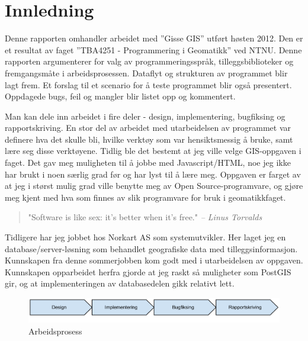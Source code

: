 \documentclass[a4paper]{article}
\begin{document}
\tableofcontents
\newpage

\section{Innledning}
	
	Denne rapporten omhandler arbeidet med ''Gisse GIS'' utført høsten 2012. Den er et resultat av faget ''TBA4251 - Programmering i Geomatikk'' ved NTNU. Denne rapporten argumenterer for valg av programmeringsspråk, tilleggsbiblioteker og fremgangsmåte i arbeidsprosessen. Dataflyt og strukturen av programmet blir lagt frem. Et forslag til et scenario for å teste programmet blir også presentert. Oppdagede bugs, feil og mangler blir listet opp og kommentert. 
	
	Man kan dele inn arbeidet i fire deler - design, implementering, bugfiksing og rapportskriving. En stor del av arbeidet med utarbeidelsen av programmet var definere hva det skulle bli, hvilke verktøy som var hensiktsmessig å bruke, samt lære seg disse verktøyene. Tidlig ble det bestemt at jeg ville velge GIS-oppgaven i faget. Det gav meg muligheten til å jobbe med Javascript/HTML, noe jeg ikke har brukt i noen særlig grad før og har lyst til å lære meg. Oppgaven er farget av at jeg i størst mulig grad ville benytte meg av Open Source-programvare, og gjøre meg kjent med hva som finnes av slik programvare for bruk i geomatikkfaget. 
	
	\begin{quotation}
		"Software is like sex: it's better when it's free." 
			\em  -- Linus Torvalds
	\end{quotation}
	
	Tidligere har jeg jobbet hos Norkart AS som systemutvikler. Her laget jeg en database/server-løsning som behandlet geografiske data med tilleggsinformasjon. Kunnskapen fra denne sommerjobben kom godt med i utarbeidelsen av oppgaven. Kunnskapen opparbeidet herfra gjorde at jeg raskt så muligheter som PostGIS gir, og at implementeringen av databasedelen gikk relativt lett.
	
	
	
	\begin{figure}[h]
	\centering
	\includegraphics[scale=0.5]{innledning.png}
	\caption{Arbeidsprosess}
	\end{figure}
	
\end{document}
